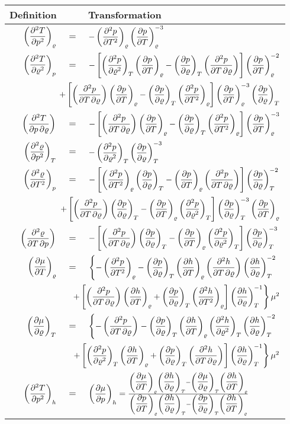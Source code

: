 \begin{tabularx}{\linewidth}{rcX}
\toprule
Definition &       & Transformation \\
\midrule
$ \der{^2 T}{p^2}{\varrho} $ & $=$   & $ -\der{^2p}{T^2}{\varrho}\der{p}{T}{\varrho}^{-3}$ \\[15pt]
$ \der{^2 T}{\varrho^2}{p} $ & $=$   & $ -\left[\der{^2p}{\varrho^2}{T}\der{p}{T}{\varrho}-\der{p}{\varrho}{T}\der{^2 p}{T \,\partial \varrho}{}\right]\der{p}{T}{\varrho}^{-2} $\\
\multicolumn{3}{r}{$ +\left[\der{^2p}{T \,\partial \varrho}{}\der{p}{T}{\varrho}-\der{p}{\varrho}{T}\der{^2p}{T^2}{\varrho}\right]\der{p}{T}{\varrho}^{-3} \der{p}{\varrho}{T}$ }\\[15pt]
$ \der{^2 T}{p \,\partial \varrho}{} $ & $=$   & $ - \left[ \der{^2p}{T \,\partial \varrho}{}\der{p}{T}{\varrho} - \der{p}{\varrho}{T}\der{^2p}{T^2}{\varrho} \right] \der{p}{T}{\varrho}^{-3}$ \\[15pt]
\midrule
$ \der{^2 \varrho}{p^2}{T} $ & $=$   & $ -\der{^2p}{\varrho^2}{T}\der{p}{\varrho}{T}^{-3}$ \\[15pt]
$ \der{^2 \varrho}{T^2}{p} $ & $=$   & $ -\left[\der{^2p}{T^2}{\varrho}\der{p}{\varrho}{T}-\der{p}{T}{\varrho}\der{^2 p}{T \,\partial \varrho}{}\right]\der{p}{\varrho}{T}^{-2} $\\
\multicolumn{3}{r}{$ +\left[\der{^2p}{T \,\partial \varrho}{}\der{p}{\varrho}{T}-\der{p}{T}{\varrho}\der{^2p}{\varrho^2}{T}\right]\der{p}{\varrho}{T}^{-3} \der{p}{T}{\varrho}$ }\\[15pt]
$ \der{^2 \varrho}{T \,\partial p}{} $ & $=$   & $ - \left[ \der{^2p}{T \,\partial \varrho}{}\der{p}{\varrho}{T} - \der{p}{T}{\varrho}\der{^2p}{\varrho^2}{T} \right] \der{p}{\varrho}{T}^{-3}$ \\[15pt]
\midrule
$ \der{\mu}{T}{\varrho} $ & $=$   & $ \left\lbrace-\der{^2p}{T^2}{\varrho} - \der{p}{\varrho}{T}\der{h}{T}{\varrho}\der{^2h}{T \,\partial \varrho}{}\der{h}{\varrho}{T}^{-2} \right.$\\
\multicolumn{3}{r}{$ \left. + \left[ \der{^2p}{T \,\partial \varrho}{}\der{h}{T}{\varrho} + \der{p}{\varrho}{T}\der{^2h}{T^2}{\varrho} \right]\der{h}{\varrho}{T}^{-1} \right\rbrace \mu^2$ }\\[15pt]
$ \der{\mu}{\varrho}{T} $ & $=$   & $ \left\lbrace-\der{^2p}{T \,\partial \varrho}{} - \der{p}{\varrho}{T}\der{h}{T}{\varrho}\der{^2h}{\varrho^2}{T}\der{h}{\varrho}{T}^{-2} \right.$\\
\multicolumn{3}{r}{$ \left. + \left[ \der{^2p}{\varrho^2}{T}\der{h}{T}{\varrho} + \der{p}{\varrho}{T}\der{^2h}{T \,\partial \varrho}{} \right]\der{h}{\varrho}{T}^{-1} \right\rbrace \mu^2$ }\\[15pt]
$ \der{^2 T}{p^2}{h} $ & $=$   & $ \der{\mu}{p}{h} = \frac{ \der{\mu}{T}{\varrho}\der{h}{\varrho}{T} - \der{\mu}{\varrho}{T}\der{h}{T}{\varrho} }
					   { \der{p}{T}{\varrho}\der{h}{\varrho}{T} - \der{p}{\varrho}{T}\der{h}{T}{\varrho} }$\\[15pt]
\bottomrule
\end{tabularx}%